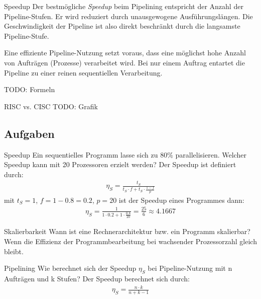 \begin{defi}[Pipelining]{Speedup}
    Der bestmögliche \emph{Speedup} beim Pipelining entspricht der Anzahl der Pipeline-Stufen.
    Er wird reduziert durch unausgewogene Ausführungslängen.
    Die Geschwindigkeit der Pipeline ist also direkt beschränkt durch die langsamste Pipeline-Stufe.

    Eine effiziente Pipeline-Nutzung setzt voraus, dass eine möglichst hohe Anzahl von Aufträgen (Prozesse) verarbeitet wird.
    Bei nur einem Auftrag entartet die Pipeline zu einer reinen sequentiellen Verarbeitung.

    TODO: Formeln
\end{defi}

\begin{example}[Pipelining]{RISC vs. CISC}
    TODO: Grafik
\end{example}

\subsection{Aufgaben}

\begin{aufgabe}{Speedup}
    Ein sequentielles Programm lasse sich zu $80\%$ parallelisieren.
    Welcher Speedup kann mit 20 Prozessoren erzielt werden?
    \tcblower
    Der Speedup ist definiert durch:
    \begin{align*}
        \eta_S = \frac{t_S}{t_S \cdot f + t_S \cdot \frac{1-f}{p}}
    \end{align*}
    mit $t_S=1$, $f=1-0.8=0.2$, $p=20$ ist der Speedup eines Programmes dann:
    \begin{align*}
        \eta_S = \frac{1}{1 \cdot 0.2 + 1 \cdot \frac{0.8}{20}} = \frac{25}{6} \approx 4.1667
    \end{align*}
\end{aufgabe}

\begin{aufgabe}{Skalierbarkeit}
    Wann ist eine Rechnerarchitektur bzw. ein Programm skalierbar?
    \tcblower
    Wenn die Effizienz der Programmbearbeitung bei wachsender Prozessorzahl gleich bleibt.
\end{aufgabe}

\begin{aufgabe}{Pipelining}
    Wie berechnet sich der Speedup $\eta_S$ bei Pipeline-Nutzung mit n Aufträgen und k Stufen?
    \tcblower
    Der Speedup berechnet sich durch:
    \begin{align*}
        \eta_S = \frac{n\cdot k}{n+k-1}
    \end{align*}
\end{aufgabe}
